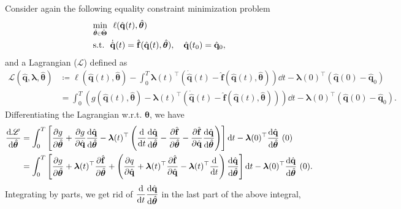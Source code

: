 Consider again the following equality constraint minimization problem\\
\begin{align*}
    &\underset{\hat{\bm{\theta}} \scalebox{0.67}{$\in$} \hat{\bm{\Theta}}}{\mathrm{min}} ~~\ell (\hat{\mathbf{q}}(t),\hat{\bm{\theta}})\\
    &\mathrm{s.t.}~~\dot{\hat{\mathbf{q}}}(t) = \hat{\mathbf{f}}(\hat{\mathbf{q}}(t),\hat{\bm{\theta}}),\quad\hat{\mathbf{q}}(t_0)=\hat{\mathbf{q}}_0,
\end{align*}
and a Lagrangian ($\mathscr{L}$) defined as\\
\begin{align*}
    \mathscr{L}(\hat{\mathbf{q}}, \bm{\lambda},\hat{\bm{\theta}}) &\coloneqq \ell(\hat{\mathbf{q}}(t),\hat{\bm{\theta}}) - \int_0^T \bm{\lambda}(t)^{\top}\left( \dot{\hat{\mathbf{q}}}(t) - \hat{\mathbf{f}}(\hat{\mathbf{q}}(t),\hat{\bm{\theta}})  \right)\dd t -\bm{\lambda}(0)^{\top}(\hat{\mathbf{q}}(0)-\hat{\mathbf{q}}_0)\\
    &= \int_0^T \left( g(\hat{\mathbf{q}}(t),\hat{\bm{\theta}}) - \bm{\lambda}(t)^{\top}\left( \dot{\hat{\mathbf{q}}}(t) - \hat{\mathbf{f}}(\hat{\mathbf{q}}(t),\hat{\bm{\theta}})  \right) \right)\dd t-\bm{\lambda}(0)^{\top}(\hat{\mathbf{q}}(0)-\hat{\mathbf{q}}_0).
\end{align*}
Differentiating the Lagrangian w.r.t. $\bm{\theta}$, we have\\
\begin{align*}
    \dv{\mathscr{L}}{\hat{\bm{\theta}}} &= \int_0^T\left[ \pdv{g}{\hat{\bm{\theta}}} + \pdv{g}{\hat{\mathbf{q}}} \dv{\hat{\mathbf{q}}}{\hat{\bm{\theta}}} - \bm{\lambda}(t)^{\top} \left( \dv{t}\dv{\hat{\mathbf{q}}}{\hat{\bm{\theta}}} - \pdv{\hat{\mathbf{f}}}{\hat{\bm{\theta}}} - \pdv{\hat{\mathbf{f}}}{\hat{\mathbf{q}}}\dv{\hat{\mathbf{q}}}{\hat{\bm{\theta}}} \right) \right]\dd t - \bm{\lambda}(0)^{\top}\dv{\hat{\mathbf{q}}}{\hat{\bm{\theta}}}~(0)\notag\\
    &= \int_0^T \left[\pdv{g}{\hat{\bm{\theta}}} + \bm{\lambda}(t)^{\top} \pdv{\hat{\mathbf{f}}}{\hat{\bm{\theta}}}+ \left( \pdv{q}{\hat{\mathbf{q}}} + \bm{\lambda}(t)^{\top}\pdv{\hat{\mathbf{f}}}{\hat{\mathbf{q}}}-\bm{\lambda}(t)^{\top}\dv{t} \right)\dv{\hat{\mathbf{q}}}{\hat{\bm{\theta}}} \right]\dd t- \bm{\lambda}(0)^{\top}\dv{\hat{\mathbf{q}}}{\hat{\bm{\theta}}}~(0). 
\end{align*}
Integrating by parts, we get rid of $\displaystyle\dv{t}\dv{\hat{\mathbf{q}}}{\hat{\bm{\theta}}}$ in the last part of the above integral,\\
